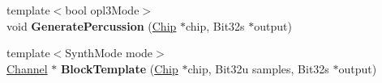 \begin{DoxyCompactItemize}
\item 
\hypertarget{structDBOPL_1_1Channel_abb3d1d632e223ac1dcee2e48e89b3c3b}{{\footnotesize template$<$bool opl3\-Mode$>$ }\\void {\bfseries Generate\-Percussion} (\hyperlink{structDBOPL_1_1Chip}{Chip} $\ast$chip, Bit32s $\ast$output)}\label{structDBOPL_1_1Channel_abb3d1d632e223ac1dcee2e48e89b3c3b}

\item 
\hypertarget{structDBOPL_1_1Channel_a731abbda797b2dacd75a92f443c82488}{{\footnotesize template$<$Synth\-Mode mode$>$ }\\\hyperlink{structDBOPL_1_1Channel}{Channel} $\ast$ {\bfseries Block\-Template} (\hyperlink{structDBOPL_1_1Chip}{Chip} $\ast$chip, Bit32u samples, Bit32s $\ast$output)}\label{structDBOPL_1_1Channel_a731abbda797b2dacd75a92f443c82488}

\end{DoxyCompactItemize}

